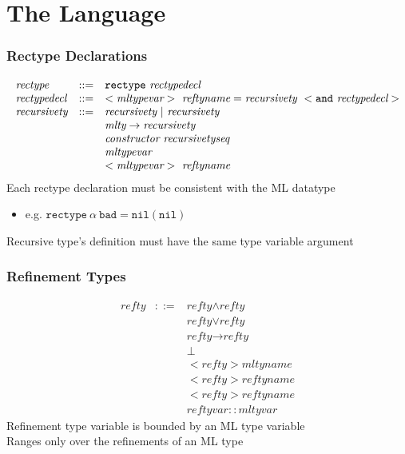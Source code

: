\documentclass[dvipdfmx,cjk,xcolor=dvipsnames,envcountsect,notheorems,aspectratio=169]{beamer}
\theoremstyle{definition}
\newcommand{\NIL}{\texttt{nil}}
\newcommand{\RECTYPE}{\texttt{rectype}}
\newcommand{\AND}{\texttt{and}}
\begin{document}
\section{The Language}

\begin{frame}
	\frametitle{Rectype Declarations}
	\[
		\begin{array}{lcl}
			\textit{rectype} & ::= & \RECTYPE~\textit{rectypedecl} \\
			\textit{rectypedecl} & ::= & <\textit{\textit{mlty}pevar}>~\textit{reftyname} = \textit{recursivety}~<\AND~\textit{rectypedecl}> \\
			\textit{recursivety} & ::= & \textit{recursivety}~|~\textit{recursivety} \\
									& & \textit{mlty} \to \textit{recursivety} \\
									& & \textit{constructor}~\textit{recursivetyseq} \\
									& & \textit{mltypevar} \\
									& & <\textit{mltypevar}>~\textit{reftyname}
		\end{array}
	\]
	\Large Each rectype declaration must be consistent with the ML datatype
	\begin{itemize}
		\item e.g. $\RECTYPE~\alpha~\texttt{bad} = \NIL (\NIL)$
	\end{itemize}
	Recursive type's definition must have the same type variable argument
\end{frame}

\begin{frame}
	\frametitle{Refinement Types}
	\[
		\begin{array}{lcl}
			\textit{refty} & ::= & \textit{refty} \land \textit{refty} \\
						& & \textit{refty} \lor \textit{refty} \\
						& & \textit{refty} \to \textit{refty} \\
						& & \bot \\
						& & <\textit{refty}> \textit{mltyname} \\
						& & <\textit{refty}> \textit{reftyname} \\
						& & <\textit{refty}> \textit{reftyname} \\
						& & \textit{reftyvar} :: \textit{mltyvar}
		\end{array}
	\]
	\Large Refinement type variable is bounded by an ML type variable \\
	Ranges only over the refinements of an ML type
\end{frame}
\end{document}
